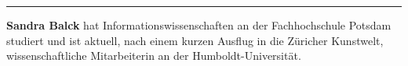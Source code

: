 \begin{center}\rule{0.5\linewidth}{\linethickness}\end{center}

\textbf{Sandra Balck} hat Informationswissenschaften an der
Fachhochschule Potsdam studiert und ist aktuell, nach einem kurzen
Ausflug in die Züricher Kunstwelt, wissenschaftliche Mitarbeiterin an
der Humboldt-Universität.
